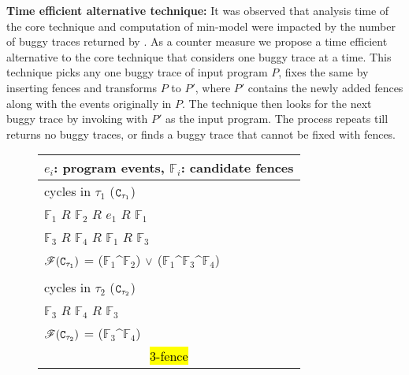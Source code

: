 \noindent
{\bf Time efficient alternative technique:} It was observed that analysis
time of the core technique and \z computation of min-model were impacted
by the number of buggy traces returned by \cds.
%
As a counter measure we propose a time efficient alternative to the core 
technique that considers one buggy trace at a time.
%
This technique picks any one buggy trace of input program $P$,
fixes the same by inserting fences and  transforms $P$ to $P'$,
where $P'$ contains the newly added fences along with the events 
originally in $P$. 
%
The technique then looks for the next buggy trace by invoking \cds 
with $P'$ as the input program. 
The process repeats till \cds returns no buggy traces, or
finds a buggy trace that cannot be fixed with \cc fences.

\begin{wrapfigure}{l}{0.45\textwidth}
	\vspace{-2.5em}
	\begin{tabular}{|l|}
		\multicolumn{1}{r}{\scriptsize $e_i$: program events,
			$\mathbb{F}_i$: candidate fences} \\
		
		\hline
		cycles in $\tau_1$ (${\tt C}_{\tau_1}$)\\
		\tab $\mathbb{F}_1$ $R$ $\mathbb{F}_2$ $R$ $e_1$ $R$ $\mathbb{F}_1$\\
		\tab $\mathbb{F}_3$ $R$ $\mathbb{F}_4$ $R$ $\mathbb{F}_1$ $R$ $\mathbb{F}_3$\\
		$\mathscr{F}({\tt C}_{\tau_1})$ = ($\mathbb{F}_1 \^ \mathbb{F}_2$) $\vee$ ($\mathbb{F}_1 \^ \mathbb{F}_3 \^ \mathbb{F}_4$)\\
		\\
		cycles in $\tau_2$ (${\tt C}_{\tau_2}$)\\
		\tab $\mathbb{F}_3$ $R$ $\mathbb{F}_4$ $R$ $\mathbb{F}_3$\\
		$\mathscr{F}({\tt C}_{\tau_2})$ = ($\mathbb{F}_3 \^ \mathbb{F}_4$)\\
		\hline
				
		\multicolumn{1}{c}{\footnotesize\hl{3-fence}}
	\end{tabular}
	\vspace{-3em}
\end{wrapfigure}


